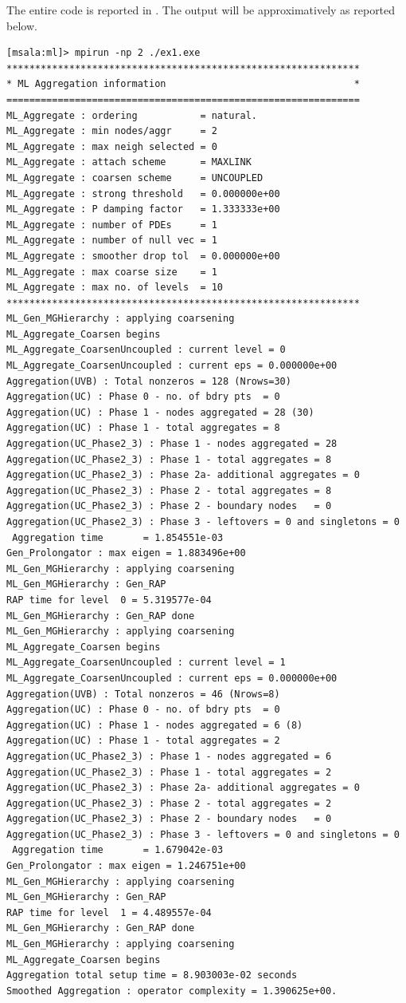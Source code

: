 The entire code is reported in .
The output will be approximatively as reported below.
\begin{verbatim}
[msala:ml]> mpirun -np 2 ./ex1.exe
**************************************************************
* ML Aggregation information                                 *
==============================================================
ML_Aggregate : ordering           = natural.
ML_Aggregate : min nodes/aggr     = 2
ML_Aggregate : max neigh selected = 0
ML_Aggregate : attach scheme      = MAXLINK
ML_Aggregate : coarsen scheme     = UNCOUPLED
ML_Aggregate : strong threshold   = 0.000000e+00
ML_Aggregate : P damping factor   = 1.333333e+00
ML_Aggregate : number of PDEs     = 1
ML_Aggregate : number of null vec = 1
ML_Aggregate : smoother drop tol  = 0.000000e+00
ML_Aggregate : max coarse size    = 1
ML_Aggregate : max no. of levels  = 10
**************************************************************
ML_Gen_MGHierarchy : applying coarsening
ML_Aggregate_Coarsen begins
ML_Aggregate_CoarsenUncoupled : current level = 0
ML_Aggregate_CoarsenUncoupled : current eps = 0.000000e+00
Aggregation(UVB) : Total nonzeros = 128 (Nrows=30)
Aggregation(UC) : Phase 0 - no. of bdry pts  = 0
Aggregation(UC) : Phase 1 - nodes aggregated = 28 (30)
Aggregation(UC) : Phase 1 - total aggregates = 8
Aggregation(UC_Phase2_3) : Phase 1 - nodes aggregated = 28
Aggregation(UC_Phase2_3) : Phase 1 - total aggregates = 8
Aggregation(UC_Phase2_3) : Phase 2a- additional aggregates = 0
Aggregation(UC_Phase2_3) : Phase 2 - total aggregates = 8
Aggregation(UC_Phase2_3) : Phase 2 - boundary nodes   = 0
Aggregation(UC_Phase2_3) : Phase 3 - leftovers = 0 and singletons = 0
 Aggregation time       = 1.854551e-03
Gen_Prolongator : max eigen = 1.883496e+00
ML_Gen_MGHierarchy : applying coarsening
ML_Gen_MGHierarchy : Gen_RAP
RAP time for level  0 = 5.319577e-04
ML_Gen_MGHierarchy : Gen_RAP done
ML_Gen_MGHierarchy : applying coarsening
ML_Aggregate_Coarsen begins
ML_Aggregate_CoarsenUncoupled : current level = 1
ML_Aggregate_CoarsenUncoupled : current eps = 0.000000e+00
Aggregation(UVB) : Total nonzeros = 46 (Nrows=8)
Aggregation(UC) : Phase 0 - no. of bdry pts  = 0
Aggregation(UC) : Phase 1 - nodes aggregated = 6 (8)
Aggregation(UC) : Phase 1 - total aggregates = 2
Aggregation(UC_Phase2_3) : Phase 1 - nodes aggregated = 6
Aggregation(UC_Phase2_3) : Phase 1 - total aggregates = 2
Aggregation(UC_Phase2_3) : Phase 2a- additional aggregates = 0
Aggregation(UC_Phase2_3) : Phase 2 - total aggregates = 2
Aggregation(UC_Phase2_3) : Phase 2 - boundary nodes   = 0
Aggregation(UC_Phase2_3) : Phase 3 - leftovers = 0 and singletons = 0
 Aggregation time       = 1.679042e-03
Gen_Prolongator : max eigen = 1.246751e+00
ML_Gen_MGHierarchy : applying coarsening
ML_Gen_MGHierarchy : Gen_RAP
RAP time for level  1 = 4.489557e-04
ML_Gen_MGHierarchy : Gen_RAP done
ML_Gen_MGHierarchy : applying coarsening
ML_Aggregate_Coarsen begins
Aggregation total setup time = 8.903003e-02 seconds
Smoothed Aggregation : operator complexity = 1.390625e+00.


\end{verbatim}
